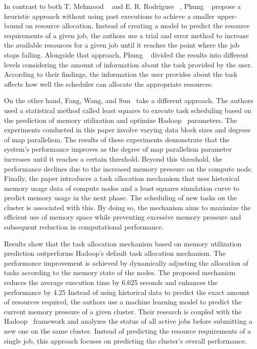In contrast to both T. Mehmood \etal~\cite{mehmood2018} and E. R. Rodrigues \etal~\cite{rodrigues2016}, Phung \etal~\cite{phung2021} propose a heuristic approach without using past executions to achieve a smaller upper-bound on resource allocation.
Instead of creating a model to predict the resource requirements of a given job, the authors use a trial and error method to increase the available resources for a given job until it reaches the point where the job stops failing.
Alongside that approach,  Phung \etal~\cite{phung2021} divided the results into different levels considering the amount of information about the task provided by the user.
According to their findings, the information the user provides about the task affects how well the scheduler can allocate the appropriate resources.

On the other hand, Fang, Wang, and Sun~\cite{fang2018} take a different approach.
The authors used a statistical method called least squares to execute task scheduling based on the prediction of memory utilization and optimize Hadoop~\cite{hadoop} parameters.
The experiments conducted in this paper involve varying data block sizes and degrees of map parallelism.
The results of these experiments demonstrate that the system's performance improves as the degree of map parallelism parameter increases until it reaches a certain threshold.
Beyond this threshold, the performance declines due to the increased memory pressure on the compute node.
Finally, the paper introduces a task allocation mechanism that uses historical memory usage data of compute nodes and a least squares simulation curve to predict memory usage in the next phase.
The scheduling of new tasks on the cluster is associated with this.
By doing so, the mechanism aims to maximize the efficient use of memory space while preventing excessive memory pressure and subsequent reduction in computational performance.

Results show that the task allocation mechanism based on memory utilization prediction outperforms Hadoop's default task allocation mechanism. The performance improvement is achieved by dynamically adjusting the allocation of tasks according to the memory state of the nodes. The proposed mechanism reduces the average execution time by 6.625 seconds and enhances the performance by 4.25%
Instead of using historical data to predict the exact amount of resources required, the authors use a machine learning model to predict the current memory pressure of a given cluster.
Their research is coupled with the Hadoop~\cite{hadoop} framework and analyzes the status of all active jobs before submitting a new one on the same cluster.
Instead of predicting the resource requirements of a single job, this approach focuses on predicting the cluster's overall performance.

